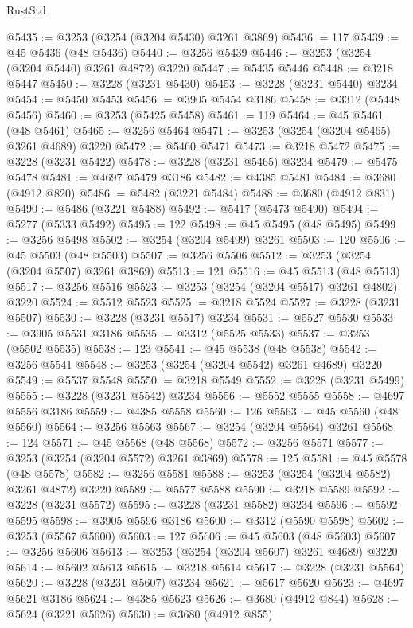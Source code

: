 \begin{lexlean}{RustStd}
\begin{coremodule}
@5435 := @3253 (@3254 (@3204 @5430) @3261 @3869)
@5436 := 117
@5439 := @45 @5436 (@48 @5436)
@5440 := @3256 @5439
@5446 := @3253 (@3254 (@3204 @5440) @3261 @4872) @3220
@5447 := @5435 @5446
@5448 := @3218 @5447
@5450 := @3228 (@3231 @5430)
@5453 := @3228 (@3231 @5440) @3234
@5454 := @5450 @5453
@5456 := @3905 @5454 @3186
@5458 := @3312 (@5448 @5456)
@5460 := @3253 (@5425 @5458)
@5461 := 119
@5464 := @45 @5461 (@48 @5461)
@5465 := @3256 @5464
@5471 := @3253 (@3254 (@3204 @5465) @3261 @4689) @3220
@5472 := @5460 @5471
@5473 := @3218 @5472
@5475 := @3228 (@3231 @5422)
@5478 := @3228 (@3231 @5465) @3234
@5479 := @5475 @5478
@5481 := @4697 @5479 @3186
@5482 := @4385 @5481
@5484 := @3680 (@4912 @820)
@5486 := @5482 (@3221 @5484)
@5488 := @3680 (@4912 @831)
@5490 := @5486 (@3221 @5488)
@5492 := @5417 (@5473 @5490)
@5494 := @5277 (@5333 @5492)
@5495 := 122
@5498 := @45 @5495 (@48 @5495)
@5499 := @3256 @5498
@5502 := @3254 (@3204 @5499) @3261
@5503 := 120
@5506 := @45 @5503 (@48 @5503)
@5507 := @3256 @5506
@5512 := @3253 (@3254 (@3204 @5507) @3261 @3869)
@5513 := 121
@5516 := @45 @5513 (@48 @5513)
@5517 := @3256 @5516
@5523 := @3253 (@3254 (@3204 @5517) @3261 @4802) @3220
@5524 := @5512 @5523
@5525 := @3218 @5524
@5527 := @3228 (@3231 @5507)
@5530 := @3228 (@3231 @5517) @3234
@5531 := @5527 @5530
@5533 := @3905 @5531 @3186
@5535 := @3312 (@5525 @5533)
@5537 := @3253 (@5502 @5535)
@5538 := 123
@5541 := @45 @5538 (@48 @5538)
@5542 := @3256 @5541
@5548 := @3253 (@3254 (@3204 @5542) @3261 @4689) @3220
@5549 := @5537 @5548
@5550 := @3218 @5549
@5552 := @3228 (@3231 @5499)
@5555 := @3228 (@3231 @5542) @3234
@5556 := @5552 @5555
@5558 := @4697 @5556 @3186
@5559 := @4385 @5558
@5560 := 126
@5563 := @45 @5560 (@48 @5560)
@5564 := @3256 @5563
@5567 := @3254 (@3204 @5564) @3261
@5568 := 124
@5571 := @45 @5568 (@48 @5568)
@5572 := @3256 @5571
@5577 := @3253 (@3254 (@3204 @5572) @3261 @3869)
@5578 := 125
@5581 := @45 @5578 (@48 @5578)
@5582 := @3256 @5581
@5588 := @3253 (@3254 (@3204 @5582) @3261 @4872) @3220
@5589 := @5577 @5588
@5590 := @3218 @5589
@5592 := @3228 (@3231 @5572)
@5595 := @3228 (@3231 @5582) @3234
@5596 := @5592 @5595
@5598 := @3905 @5596 @3186
@5600 := @3312 (@5590 @5598)
@5602 := @3253 (@5567 @5600)
@5603 := 127
@5606 := @45 @5603 (@48 @5603)
@5607 := @3256 @5606
@5613 := @3253 (@3254 (@3204 @5607) @3261 @4689) @3220
@5614 := @5602 @5613
@5615 := @3218 @5614
@5617 := @3228 (@3231 @5564)
@5620 := @3228 (@3231 @5607) @3234
@5621 := @5617 @5620
@5623 := @4697 @5621 @3186
@5624 := @4385 @5623
@5626 := @3680 (@4912 @844)
@5628 := @5624 (@3221 @5626)
@5630 := @3680 (@4912 @855)

\end{coremodule}
\end{lexlean}
